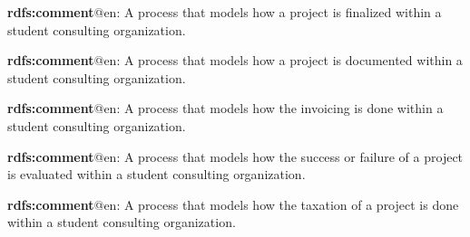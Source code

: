 \documentclass[a4paper, DIV=13, BCOR=0cm]{scrbook}
\begin{document}
\begin{mdframed}[style=onto-2, frametitle={Project Finalization Process}]
	{%
		\begin{compactitem}
			\item \textbf{rdfs:comment}@en: A process that models how a project is finalized within a student consulting organization.
		\end{compactitem}
	} %
\end{mdframed}

\begin{mdframed}[style=onto-3, frametitle={Project Documentation Process}]
	{%
		\begin{compactitem}
			\item \textbf{rdfs:comment}@en: A process that models how a project is documented within a student consulting organization.
		\end{compactitem}
	} %
\end{mdframed}

\begin{mdframed}[style=onto-3, frametitle={Project Invoicing Process}]
	{%
		\begin{compactitem}
			\item \textbf{rdfs:comment}@en: A process that models how the invoicing is done within a student consulting organization.
		\end{compactitem}
	} %
\end{mdframed}

\begin{mdframed}[style=onto-3, frametitle={Project Evaluation Process}]
	{%
		\begin{compactitem}
			\item \textbf{rdfs:comment}@en: A process that models how the success or failure of a project is evaluated within a student consulting organization.
		\end{compactitem}
	} %
\end{mdframed}

\begin{mdframed}[style=onto-3, frametitle={Project Taxation Process}]
	{%
		\begin{compactitem}
			\item \textbf{rdfs:comment}@en: A process that models how the taxation of a project is done within a student consulting organization.
		\end{compactitem}
	} %
\end{mdframed}
\end{document}
